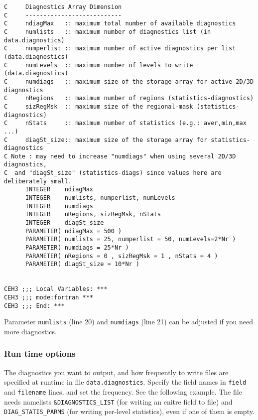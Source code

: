 \documentclass[11pt]{article}
\begin{document}
\begin{lstlisting}[caption={Example \texttt{DIAGNOSTICS\symbol{95}SIZE.h} file}, captionpos=b]
C     Diagnostics Array Dimension
C     ---------------------------
C     ndiagMax   :: maximum total number of available diagnostics
C     numlists   :: maximum number of diagnostics list (in data.diagnostics)
C     numperlist :: maximum number of active diagnostics per list (data.diagnostics)
C     numLevels  :: maximum number of levels to write    (data.diagnostics)
C     numdiags   :: maximum size of the storage array for active 2D/3D diagnostics
C     nRegions   :: maximum number of regions (statistics-diagnostics)
C     sizRegMsk  :: maximum size of the regional-mask (statistics-diagnostics)
C     nStats     :: maximum number of statistics (e.g.: aver,min,max ...)
C     diagSt_size:: maximum size of the storage array for statistics-diagnostics
C Note : may need to increase "numdiags" when using several 2D/3D diagnostics,
C  and "diagSt_size" (statistics-diags) since values here are deliberately small.
      INTEGER    ndiagMax
      INTEGER    numlists, numperlist, numLevels
      INTEGER    numdiags
      INTEGER    nRegions, sizRegMsk, nStats
      INTEGER    diagSt_size
      PARAMETER( ndiagMax = 500 )
      PARAMETER( numlists = 25, numperlist = 50, numLevels=2*Nr )
      PARAMETER( numdiags = 25*Nr )
      PARAMETER( nRegions = 0 , sizRegMsk = 1 , nStats = 4 )
      PARAMETER( diagSt_size = 10*Nr )


CEH3 ;;; Local Variables: ***
CEH3 ;;; mode:fortran ***
CEH3 ;;; End: ***
\end{lstlisting}

Parameter \verb|numlists| (line 20) and \verb|numdiags| (line 21) can be adjusted if you need more diagnostics.

\subsubsection*{Run time options}
The diagnostics you want to output, and how frequently to write files are specified at runtime in file \verb|data.diagnostics|. Specify the field names in \verb|field| and \verb|filename| lines, and set the frequency. See the following example. The file needs namelists \verb|&DIAGNOSTICS_LIST| (for writing an enitre field to file) and \verb|DIAG_STATIS_PARMS| (for writing per-level statistics), even if one of them is empty.
\end{document}
